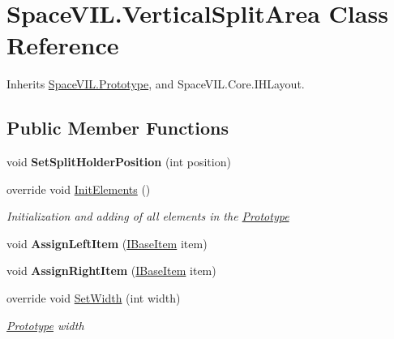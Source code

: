 \hypertarget{class_space_v_i_l_1_1_vertical_split_area}{}\section{Space\+V\+I\+L.\+Vertical\+Split\+Area Class Reference}
\label{class_space_v_i_l_1_1_vertical_split_area}


Inherits \mbox{\hyperlink{class_space_v_i_l_1_1_prototype}{Space\+V\+I\+L.\+Prototype}}, and Space\+V\+I\+L.\+Core.\+I\+H\+Layout.

\subsection*{Public Member Functions}
\begin{DoxyCompactItemize}
\item 
\mbox{\label{class_space_v_i_l_1_1_vertical_split_area_a8aa51b2b1d21e1a0d788a21e9027ca4f}} 
void {\bfseries Set\+Split\+Holder\+Position} (int position)
\item 
override void \mbox{\hyperlink{class_space_v_i_l_1_1_vertical_split_area_ac00bf6f3d89b83dadcdd05f6e95b97d8}{Init\+Elements}} ()
\begin{DoxyCompactList}\small\item\em Initialization and adding of all elements in the \mbox{\hyperlink{class_space_v_i_l_1_1_prototype}{Prototype}} \end{DoxyCompactList}\item 
\mbox{\label{class_space_v_i_l_1_1_vertical_split_area_a2b226695a4f66447246db5923f3465b3}} 
void {\bfseries Assign\+Left\+Item} (\mbox{\hyperlink{interface_space_v_i_l_1_1_core_1_1_i_base_item}{I\+Base\+Item}} item)
\item 
\mbox{\label{class_space_v_i_l_1_1_vertical_split_area_a3cc27337a3ec6eb3c25e9420fac2eef1}} 
void {\bfseries Assign\+Right\+Item} (\mbox{\hyperlink{interface_space_v_i_l_1_1_core_1_1_i_base_item}{I\+Base\+Item}} item)
\item 
override void \mbox{\hyperlink{class_space_v_i_l_1_1_vertical_split_area_a665c01c8beced7686b57b7f4d41f3b70}{Set\+Width}} (int width)
\begin{DoxyCompactList}\small\item\em \mbox{\hyperlink{class_space_v_i_l_1_1_prototype}{Prototype}} width \end{DoxyCompactList}\item 

\end{DoxyCompactItemize}
